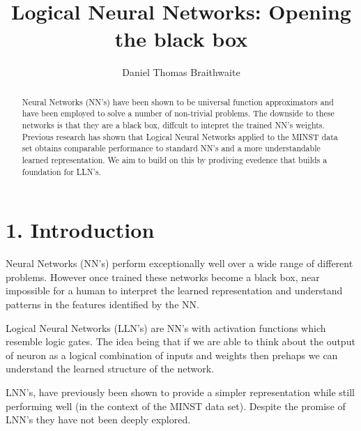 \documentclass[11pt, a4paper, twoside, openright]{report}
\title{Logical Neural Networks: Opening the black box}
\author{Daniel Thomas Braithwaite}
\date{}
\begin{document}
\frontmatter


\begin{abstract}
Neural Networks (NN's) have been shown to be universal function approximators and have been employed to solve a number of non-trivial problems. The downside to these networks is that they are a black box, diffcult to intepret the trained NN's weights. Previous research has shown that Logical Neural Networks applied to the MINST data set obtains comparable performance to standard NN's and a more understandable learned representation. We aim to build on this by prodiving evedence that builds a foundation for LLN's.
\end{abstract}


\maketitle




\mainmatter


\section*{1. Introduction}

Neural Networks (NN's) perform exceptionally well over a wide range of different problems. However once trained these networks become a black box, near impossible for a human to interpret the learned representation and understand patterns in the features identified by the NN. 

Logical Neural Networks (LLN's) are NN's with activation functions which resemble logic gates. The idea being that if we are able to think about the output of neuron as a logical combination of inputs and weights then prehaps we can understand the learned structure of the network.

LNN's, have previously been shown to provide a simpler representation while still performing well \cite{LearningLogicalActivations} (in the context of the MINST data set). Despite the promise of LNN's they have not been deeply explored.
\end{document}
